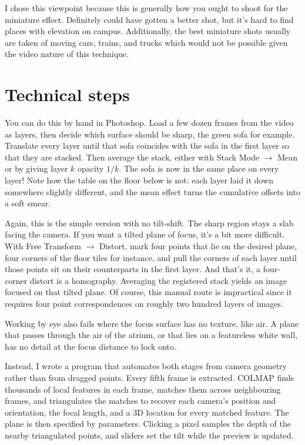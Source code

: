 \documentclass[11pt]{article}
\begin{document}
I chose this viewpoint because this is generally how you ought to shoot for the miniature effect. Definitely could have gotten a better shot, but it's hard to find places with elevation on campus. Additionally, the best miniature shots usually are taken of moving cars, trains, and trucks which would not be possible given the video nature of this technique.

\section{Technical steps}
You can do this by hand in Photoshop. Load a few dozen frames from the video as layers, then decide which surface should be sharp, the green sofa for example. Translate every layer until that sofa coincides with the sofa in the first layer so that they are stacked. Then average the stack, either with Stack Mode $\rightarrow$ Mean or by giving layer $k$ opacity $1/k$. The sofa is now in the same place on every layer! Note how the table on the floor below is not: each layer laid it down somewhere slightly different, and the mean effect turns the cumulative offsets into a soft smear.

Again, this is the simple version with no tilt-shift. The sharp region stays a slab facing the camera. If you want a tilted plane of focus, it's a bit more difficult. With Free Transform $\rightarrow$ Distort, mark four points that lie on the desired plane, four corners of the floor tiles for instance, and pull the corners of each layer until those points sit on their counterparts in the first layer. And that's it, a four-corner distort is a homography. Averaging the registered stack yields an image focused on that tilted plane. Of course, this manual route is impractical since it requires four point correspondences on roughly two hundred layers of images.

Working by eye also fails where the focus surface has no texture, like air. A plane that passes through the air of the atrium, or that lies on a featureless white wall, has no detail at the focus distance to lock onto.

Instead, I wrote a program that automates both stages from camera geometry rather than from dragged points. Every fifth frame is extracted. COLMAP finds thousands of local features in each frame, matches them across neighbouring frames, and triangulates the matches to recover each camera's position and orientation, the focal length, and a 3D location for every matched feature. The plane is then specified by parameters. Clicking a pixel samples the depth of the nearby triangulated points, and sliders set the tilt while the preview is updated.
\end{document}
